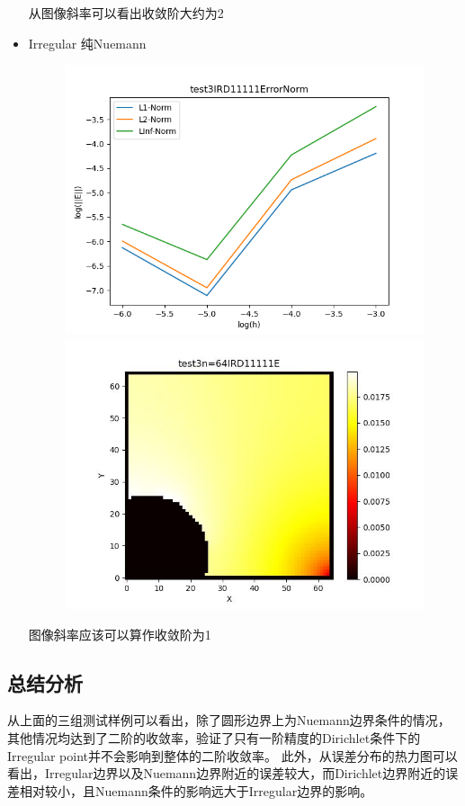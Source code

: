\documentclass{article}
\begin{document}
\begin{itemize}
    从图像斜率可以看出收敛阶大约为2
    \item Irregular 纯Nuemann
    \begin{figure}[h]
        \centering
        \includegraphics[width=0.35\linewidth]{test3IRD11111ErrorNormjpg.png}
        \includegraphics[width=0.35\linewidth]{test3n=64IRD11111E.jpg}
    \end{figure}

    图像斜率应该可以算作收敛阶为1
\end{itemize}

\subsection{总结分析}
从上面的三组测试样例可以看出，除了圆形边界上为Nuemann边界条件的情况，其他情况均达到了二阶的收敛率，验证了只有一阶精度的Dirichlet条件下的Irregular point并不会影响到整体的二阶收敛率。
此外，从误差分布的热力图可以看出，Irregular边界以及Nuemann边界附近的误差较大，而Dirichlet边界附近的误差相对较小，且Nuemann条件的影响远大于Irregular边界的影响。
\end{document}
